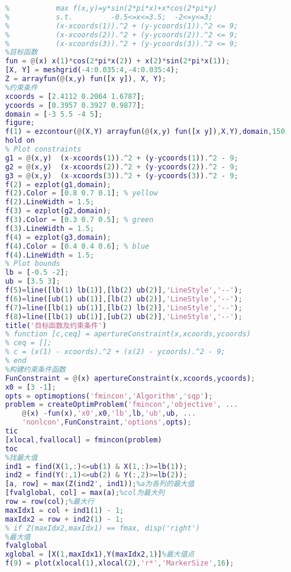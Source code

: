    \begin{lstlisting}[language=Matlab]
    %% 智能优化引例2：有约束
    %           max f(x,y)=y*sin(2*pi*x)+x*cos(2*pi*y)
    %           s.t.         -0.5<=x<=3.5;  -2<=y<=3;
    %           (x-xcoords(1)).^2 + (y-ycoords(1)).^2 <= 9;
    %           (x-xcoords(2)).^2 + (y-ycoords(2)).^2 <= 9;
    %           (x-xcoords(3)).^2 + (y-ycoords(3)).^2 <= 9;
    %目标函数
    fun = @(x) x(1)*cos(2*pi*x(2)) + x(2)*sin(2*pi*x(1));
    [X, Y] = meshgrid(-4:0.035:4,-4:0.035:4);
    Z = arrayfun(@(x,y) fun([x y]), X, Y);
    %约束条件
    xcoords = [2.4112 0.2064 1.6787];
    ycoords = [0.3957 0.3927 0.9877];
    domain = [-3 5.5 -4 5];
    figure;
    f(1) = ezcontour(@(X,Y) arrayfun(@(x,y) fun([x y]),X,Y),domain,150);
    hold on
    % Plot constraints
    g1 = @(x,y)  (x-xcoords(1)).^2 + (y-ycoords(1)).^2 - 9;
    g2 = @(x,y)  (x-xcoords(2)).^2 + (y-ycoords(2)).^2 - 9;
    g3 = @(x,y)  (x-xcoords(3)).^2 + (y-ycoords(3)).^2 - 9;
    f(2) = ezplot(g1,domain);
    f(2).Color = [0.8 0.7 0.1]; % yellow
    f(2).LineWidth = 1.5;
    f(3) = ezplot(g2,domain);
    f(3).Color = [0.3 0.7 0.5]; % green
    f(3).LineWidth = 1.5;
    f(4) = ezplot(g3,domain);
    f(4).Color = [0.4 0.4 0.6]; % blue
    f(4).LineWidth = 1.5;
    % Plot bounds
    lb = [-0.5 -2];
    ub = [3.5 3];
    f(5)=line([lb(1) lb(1)],[lb(2) ub(2)],'LineStyle','--');
    f(6)=line([ub(1) ub(1)],[lb(2) ub(2)],'LineStyle','--');
    f(7)=line([lb(1) ub(1)],[lb(2) lb(2)],'LineStyle','--');
    f(8)=line([lb(1) ub(1)],[ub(2) ub(2)],'LineStyle','--');
    title('目标函数及约束条件')
    % function [c,ceq] = apertureConstraint(x,xcoords,ycoords)
    % ceq = [];
    % c = (x(1) - xcoords).^2 + (x(2) - ycoords).^2 - 9;
    % end
    %构建约束条件函数
    FunConstraint = @(x) apertureConstraint(x,xcoords,ycoords);
    x0 = [3 -1];
    opts = optimoptions('fmincon','Algorithm','sqp');
    problem = createOptimProblem('fmincon','objective', ...
        @(x) -fun(x),'x0',x0,'lb',lb,'ub',ub, ...
        'nonlcon',FunConstraint,'options',opts);
    tic
    [xlocal,fvallocal] = fmincon(problem)
    toc
    %找最大值
    ind1 = find(X(1,:)<=ub(1) & X(1,:)>=lb(1));
    ind2 = find(Y(:,1)<=ub(2) & Y(:,2)>=lb(2));
    [a, row] = max(Z(ind2', ind1));%a为各列的最大值
    [fvalglobal, col] = max(a);%col为最大列
    row = row(col);%最大行
    maxIdx1 = col + ind1(1) - 1;
    maxIdx2 = row + ind2(1) - 1;
    % if Z(maxIdx2,maxIdx1) == fmax, disp('right')
    %最大值
    fvalglobal
    xglobal = [X(1,maxIdx1),Y(maxIdx2,1)]%最大值点
    f(9) = plot(xlocal(1),xlocal(2),'r*','MarkerSize',16);

\end{lstlisting}
